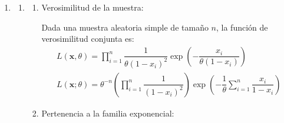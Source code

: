 \begin{enumerate}[label=\color{red}\textbf{\arabic*)}]
\begin{enumerate}[label=\color{red}\textbf{\alph*)}]
		            Puesto que el modelo posee Cociente de Verosimilitud Monótono en $T(\mathbf{x})=\sum \log(x_{i})$, el test uniforme de máxima potencia para alternativas unilaterales mantiene exactamente la misma estructura que en el apartado : \[
			            S_1=\left\{ \mathbf{x}\bigg| \sum_{i=1}^{n} \log(x_{i})\le c\right\}
		            \]
		            Con extensión $\alpha=P_{\theta_0}\left( \sum \log(X_i)\le c \right)$.
		      \item {}

		            \textbf{Sí, se puede extender.} La construcción fundamentada en el CVM "se extiende al contraste $H_0:\theta\ge \theta_0$ frente a $H_1:\theta<\theta_0$". El estadístico, la región de rechazo y la obtención de la constante de extensión $\alpha$ calculada en el límite $(\theta=\theta_0)$ permanecen idénticos.
	      \end{enumerate}
	\item {}
	      \begin{enumerate}[label=\color{red}\textbf{\alph*)}]
		      \item {}
		            \begin{enumerate}[label=\arabic*)]
			            \item Verosimilitud de la muestra:

			                  Dada una muestra aleatoria simple de tamaño $n$, la función de verosimilitud conjunta es:  \[
				                  \begin{array}{c}
					                  L(\mathbf{x},\theta)=\prod_{i=1}^{n} \dfrac{1}{\theta(1-x_{i})^2}\exp \left( -\dfrac{x_{i}}{\theta(1-x_{i})} \right) \\
					                  L(\mathbf{x};\theta)=\theta^{-n}\left( \prod_{i=1}^{n} \dfrac{1}{(1-x_{i})^2}  \right) \exp\left( -\dfrac{1}{\theta}\sum_{i=1}^{n} \dfrac{x_{i}}{1-x_{i}} \right)
				                  \end{array}
			                  \]
			            \item Pertenencia a la familia exponencial:


\end{enumerate}
\end{enumerate}
\end{enumerate}
